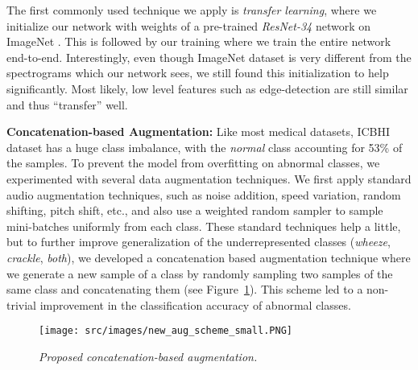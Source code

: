 \documentclass{article}
\begin{document}
The first commonly used technique we apply is \textit{transfer learning}, where we initialize our network with weights of a pre-trained \textit{ResNet-34} network on ImageNet \cite{ILSVRC15}. This is followed by our training where we train the entire network end-to-end. Interestingly, even though ImageNet dataset is very different from the spectrograms which our network sees, we still found this initialization to help significantly. Most likely, low level features such as edge-detection are still similar and thus ``transfer'' well.

\smallskip\noindent\textbf{Concatenation-based Augmentation:} Like most medical datasets, ICBHI dataset has a huge class imbalance, with the \textit{normal} class accounting for 53\% of the samples. To prevent the model from overfitting on abnormal classes, we experimented with several data augmentation techniques. We first apply standard audio augmentation techniques, such as noise addition, speed variation, random shifting, pitch shift, etc., and also use a weighted random sampler to sample mini-batches uniformly from each class. These standard techniques help a little, but to further improve generalization of the underrepresented classes (\textit{wheeze}, \textit{crackle}, \textit{both}), we developed a concatenation based augmentation technique where we generate a new sample of a class by randomly sampling two samples of the same class and concatenating them (see Figure~\ref{fig:new_aug_scheme}). This scheme led to a non-trivial improvement in the classification accuracy of abnormal classes.


\begin{figure}[!htbp]
\begin{center}
    \centering
    \texttt{[image: src/images/new\_aug\_scheme\_small.PNG]}
\end{center}
\vspace{-5mm}
    \caption{\textit{Proposed concatenation-based augmentation.}} 
    \label{fig:new_aug_scheme}
\end{figure}

\noindent
\end{document}
